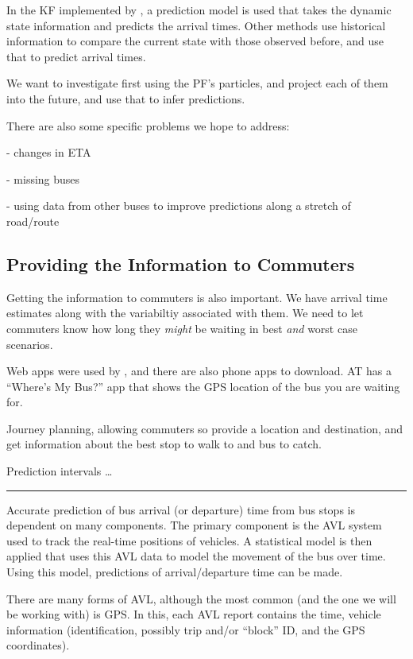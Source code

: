 \documentclass[12pt,a4paper]{article}
\begin{document}
In the KF implemented by \cite{cathey-dailey:2003}, 
a prediction model is used that takes the dynamic state information and predicts the arrival times.
Other methods use historical information to compare the current state with those observed before,
and use that to predict arrival times.

We want to investigate first using the PF's particles, and project each of them into the future, 
and use that to infer predictions.

There are also some specific problems we hope to address:

- changes in ETA

- missing buses

- using data from other buses to improve predictions along a stretch of road/route 


\subsection{Providing the Information to Commuters}
\label{sec:information_to_commuters}

Getting the information to commuters is also important.
We have arrival time estimates along with the variabiltiy associated with them.
We need to let commuters know how long they \emph{might} be waiting in best \emph{and} worst case scenarios.

Web apps were used by \cite{cathey-dailey:2003}, and there are also phone apps to download.
AT has a ``Where's My Bus?'' app that shows the GPS location of the bus you are waiting for.

Journey planning, allowing commuters so provide a location and destination, 
and get information about the best stop to walk to and bus to catch.

Prediction intervals \ldots \cite{mazloumi-etal:2011}


\vspace{1cm}
\hrule
\vspace{1cm}


Accurate prediction of bus arrival (or departure) time from bus stops is dependent on many components.
The primary component is the AVL system used to track the real-time positions of vehicles.
A statistical model is then applied that uses this AVL data to model the movement of the bus over time. 
Using this model, predictions of arrival/departure time can be made.


There are many forms of AVL, although the most common (and the one we will be working with) is GPS.
In this, each AVL report contains the time, vehicle information (identification, possibly trip and/or ``block'' ID,
and the GPS coordinates).
\end{document}
